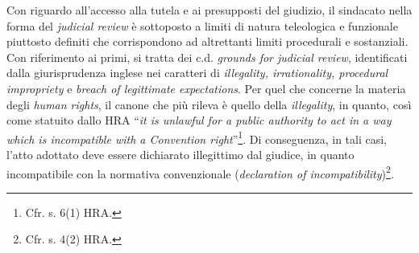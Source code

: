 \documentclass[12pt,it,a4paper,]{report}
\begin{document}
Con riguardo all'accesso alla tutela e ai presupposti del giudizio, il
sindacato nella forma del \emph{judicial review} è sottoposto a limiti
di natura teleologica e funzionale piuttosto definiti che corrispondono
ad altrettanti limiti procedurali e sostanziali. Con riferimento ai
primi, si tratta dei c.d. \emph{grounds for judicial review},
identificati dalla giurisprudenza inglese nei caratteri di
\emph{illegality, irrationality, procedural impropriety} e \emph{breach
of legittimate expectations}. Per quel che concerne la materia degli
\emph{human rights}, il canone che più rileva è quello della
\emph{illegality}, in quanto, così come statuito dallo HRA ``\emph{it is
unlawful for a public authority to act in a way which is incompatible
with a Convention right}''\footnote{Cfr. s. 6(1) HRA.}. Di conseguenza,
in tali casi, l'atto adottato deve essere dichiarato illegittimo dal
giudice, in quanto incompatibile con la normativa convenzionale
(\emph{declaration of incompatibility})\footnote{Cfr. s. 4(2) HRA.}.
\end{document}
